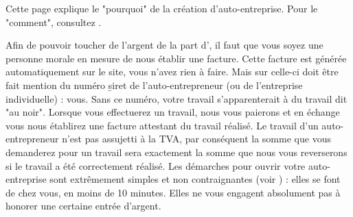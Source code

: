 ﻿Cette page explique le "pourquoi" de la création d'auto-entreprise. Pour le "comment", consultez .

Afin de pouvoir toucher de l'argent de la part d'\eDevoir, il faut que vous soyez une personne morale en mesure de nous établir une facture. Cette facture est générée automatiquement sur le site, vous n'avez rien à faire. Mais sur celle-ci doit être fait mention du numéro \b{siret} de l'auto-entrepreneur (ou de l'entreprise individuelle) : vous. Sans ce numéro, votre travail s'apparenterait à du travail dit "au noir". Lorsque vous effectuerez un travail, nous vous paierons et en échange vous nous établirez une facture attestant du travail réalisé. Le travail d'un auto-entrepreneur n'est pas assujetti à la TVA, par conséquent la somme que vous demanderez pour un travail sera exactement la somme que nous vous reverserons si le travail a été correctement réalisé.
Les démarches pour ouvrir votre auto-entreprise sont extrêmement simples et non contraignantes (voir ) : elles se font de chez vous, en moins de 10 minutes. Elles ne vous engagent absolument pas à honorer une certaine entrée d'argent.
